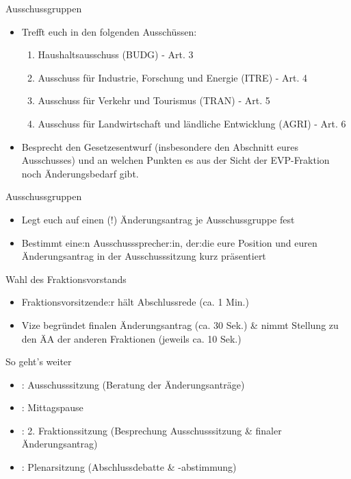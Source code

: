 \documentclass{beamer}
\newcommand{\Fraktionskuerzel}{EVP}
\newcommand{\Fraktionskuerzel}{S\&D}
\newcommand{\Fraktionskuerzel}{Renew}
\newcommand{\Fraktionskuerzel}{Grüne/EFA}
\newcommand{\Fraktionskuerzel}{ID}
\newcommand{\Fraktionskuerzel}{Falsches Fraktionskürzel}
\newcommand{\ausschussgruppen}{
        \begin{enumerate}
            \item Haushaltsausschuss (BUDG) - Art. 3
            \item Ausschuss für Industrie, Forschung und Energie (ITRE) - Art. 4
            \item Ausschuss für Verkehr und Tourismus (TRAN) - Art. 5
            \item Ausschuss für Landwirtschaft und ländliche Entwicklung (AGRI) - Art. 6
        \end{enumerate}
    }
\newcommand{\ausschussgruppen}{
        \begin{enumerate}
            \item Ausschuss für bürgerliche Freiheiten, Justiz und Inneres (LIBE) \newline - Art. 3
            \item Unterausschuss für Menschenrechte (DROI) \newline - Art. 4
            \item  Ausschuss für Auswärtige Angelegenheiten (AFET) \newline - Art. 5
        \end{enumerate}
    		}%
\newcommand{\ausschussgruppen}{
        \begin{enumerate}
            \item Haushaltsausschuss (BUDG) \newline - \textit{Finanzierung}
            \item Ausschuss für bürgerliche Freiheiten, Justiz und Inneres (LIBE) \newline - \textit{Dienstrecht}
            \item  Unterausschuss für Sicherheit und Verteidigung (SEDE) \newline - \textit{Beschaffung}
        \end{enumerate}
    	}
\newcommand{\ausschussgruppen}{Falsches Thema}
\begin{document}
\begin{frame}{Ausschussgruppen}
\vspace{-1cm}
\begin{itemize}
    \item Trefft euch in den folgenden Ausschüssen:
    \ausschussgruppen
    \item Besprecht den Gesetzesentwurf (insbesondere den Abschnitt eures Ausschusses) und an welchen Punkten es aus der Sicht der \Fraktionskuerzel -Fraktion noch Änderungsbedarf gibt.
\end{itemize}
\end{frame}

\begin{frame}{Ausschussgruppen}
\vspace{-1.5cm}
\begin{itemize}
    \item Legt euch auf einen (!) Änderungsantrag je Ausschussgruppe fest
    \item Bestimmt eine:n Ausschusssprecher:in, der:die eure Position und euren Änderungsantrag in der Ausschusssitzung kurz präsentiert
\end{itemize}
\end{frame}



\begin{frame}{Wahl des Fraktionsvorstands}
\vspace{-1.5cm}
\begin{itemize}
    \item Fraktionsvorsitzende:r hält Abschlussrede (ca. 1 Min.)
    \item Vize begründet finalen Änderungsantrag (ca. 30 Sek.) \& nimmt Stellung zu den ÄA der anderen Fraktionen \newline (jeweils ca. 10 Sek.)
\end{itemize} 
\end{frame}



\begin{frame}{So geht's weiter}
\vspace{-1.5cm}
\begin{itemize}
    \item \timeAuss: Ausschusssitzung \newline (Beratung der Änderungsanträge)
    \item \timeMittag: Mittagspause
    \item \timeFrakTwo: 2. Fraktionssitzung (Besprechung Ausschusssitzung \& finaler Änderungsantrag)
    \item \timePlenar: Plenarsitzung \newline (Abschlussdebatte \& -abstimmung)
\end{itemize}
\end{frame}
\end{document}
